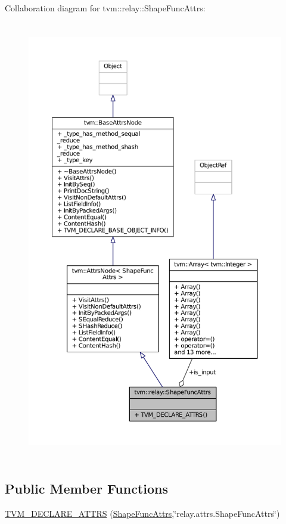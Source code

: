 Collaboration diagram for tvm\+:\+:relay\+:\+:Shape\+Func\+Attrs\+:
\nopagebreak
\begin{figure}[H]
\begin{center}
\leavevmode
\includegraphics[height=550pt]{structtvm_1_1relay_1_1ShapeFuncAttrs__coll__graph}
\end{center}
\end{figure}
\subsection*{Public Member Functions}
\begin{DoxyCompactItemize}
\item 
\hyperlink{structtvm_1_1relay_1_1ShapeFuncAttrs_ad64ca884231f468064d3ec2b82f50d99}{T\+V\+M\+\_\+\+D\+E\+C\+L\+A\+R\+E\+\_\+\+A\+T\+T\+RS} (\hyperlink{structtvm_1_1relay_1_1ShapeFuncAttrs}{Shape\+Func\+Attrs},\char`\"{}relay.\+attrs.\+Shape\+Func\+Attrs\char`\"{})
\end{DoxyCompactItemize}
